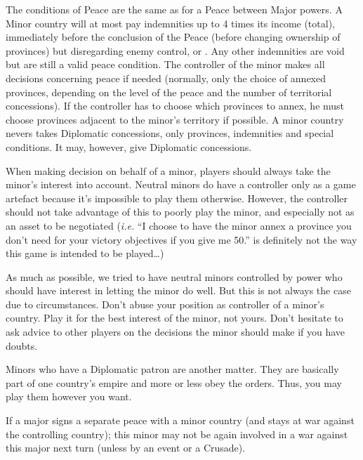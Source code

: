 \bparag The conditions of Peace are the same as for a Peace between Major
powers.
\bparag A Minor country will at most pay indemnities up to 4 times its income
(total), immediately before the conclusion of the Peace (before changing
ownership of provinces) but disregarding enemy control, \REVOLT or
\PILLAGE. Any other indemnities are void but are still a valid peace
condition.
\bparag The controller of the minor makes all decisions concerning peace if
needed (normally, only the choice of annexed provinces, depending on the level
of the peace and the number of territorial concessions). If the controller has
to choose which provinces to annex, he must choose provinces adjacent to the
minor's territory if possible.
\bparag A minor country nevers takes Diplomatic concessions, only provinces,
indemnities and special conditions. It may, however, give Diplomatic
concessions.

\begin{designnote}
  When making decision on behalf of a minor, players should always take the
  minor's interest into account. Neutral minors do have a controller only as a
  game artefact because it's impossible to play them otherwise. However, the
  controller should not take advantage of this to poorly play the minor, and
  especially not as an asset to be negotiated (\emph{i.e.} ``I choose to have
  the minor annex a province you don't need for your victory objectives if you
  give me 50\ducats.'' is definitely not the way this game is intended to be
  played\ldots)

  As much as possible, we tried to have neutral minors controlled by power who
  should have interest in letting the minor do well. But this is not always
  the case due to circumstances. Don't abuse your position as controller of a
  minor's country. Play it for the best interest of the minor, not
  yours. Don't hesitate to ask advice to other players on the decisions the
  minor should make if you have doubts.

  Minors who have a Diplomatic patron are another matter. They are basically
  part of one country's empire and more or less obey the orders. Thus, you may
  play them however you want.
\end{designnote}

If a major signs a separate peace with a minor country (and stays at war
against the controlling country); this minor may not be again involved in a
war against this major next turn (unless by an event or a Crusade).

